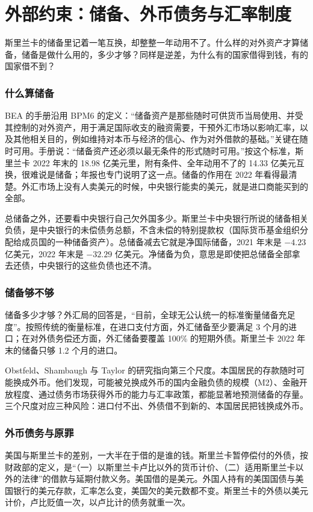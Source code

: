 \section{外部约束：储备、外币债务与汇率制度}\label{sec:external-constraint}

斯里兰卡的储备里记着一笔互换，却整整一年动用不了。什么样的对外资产才算储备，储备是做什么用的，多少才够？同样是逆差，为什么有的国家借得到钱，有的国家借不到？

\subsubsection{什么算储备}
BEA 的手册沿用 BPM6 的定义：“储备资产是那些随时可供货币当局使用、并受其控制的对外资产，用于满足国际收支的融资需要，干预外汇市场以影响汇率，以及其他相关目的，例如维持对本币与经济的信心、作为对外借款的基础。”\cite{bea2026iea}关键在随时可用。手册说：“储备资产还必须以最无条件的形式随时可用。”\cite{bea2026iea}按这个标准，斯里兰卡 2022 年末的 18.98 亿美元里，附有条件、全年动用不了的 14.33 亿美元互换，很难说是储备；年报也专门说明了这一点\cite{cbsl2023ar}。储备的作用在 2022 年看得最清楚。外汇市场上没有人卖美元的时候，中央银行能卖的美元，就是进口商能买到的全部。

总储备之外，还要看中央银行自己欠外国多少。斯里兰卡中央银行所说的储备相关负债，是中央银行的未偿债务总额，不含未偿的特别提款权（国际货币基金组织分配给成员国的一种储备资产）。总储备减去它就是净国际储备，2021 年末是 $-4.23$ 亿美元，2022 年末是 $-32.29$ 亿美元\cite{cbsl2023ar}。净储备为负，意思是即使把总储备全部拿去还债，中央银行的这些负债也还不清。

\subsubsection{储备够不够}
储备多少才够？外汇局的回答是，“目前，全球无公认统一的标准衡量储备充足度”。按照传统的衡量标准，在进口支付方面，外汇储备至少要满足 3 个月的进口；在对外债务偿还方面，外汇储备要覆盖 100\% 的短期外债\cite{safe2017}。斯里兰卡 2022 年末的储备只够 1.2 个月的进口\cite{cbsl2023ar}。

Obstfeld、Shambaugh 与 Taylor 的研究指向第三个尺度。本国居民的存款随时可能换成外币。他们发现，可能被兑换成外币的国内金融负债的规模（M2）、金融开放程度、通过债务市场获得外币的能力与汇率政策，都能显著地预测储备的存量\cite{obstfeld2010}。三个尺度对应三种风险：进口付不出、外债借不到新的、本国居民把钱换成外币。

\subsubsection{外币债务与原罪}
美国与斯里兰卡的差别，一大半在于借的是谁的钱。斯里兰卡暂停偿付的外债，按财政部的定义，是“（一）以斯里兰卡卢比以外的货币计价、（二）适用斯里兰卡以外的法律”的借款与延期付款义务\cite{lktreasury2022}。美国借的是美元。外国人持有的美国国债与美国银行的美元存款，汇率怎么变，美国欠的美元数都不变。斯里兰卡的外债以美元计价，卢比贬值一次，以卢比计的债务就重一次。

